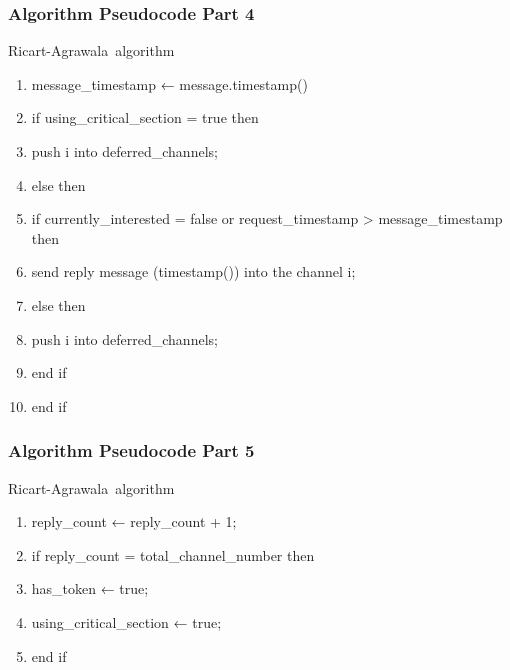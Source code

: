 \documentclass[11pt]{beamer}              %
\begin{document}
\begin{frame}
\frametitle{Algorithm Pseudocode Part 4}

\begin{center}
\begin{algorithm}[H]
	\scriptsize
	\def\algorithmlabel{Ricart-Agrawala}
    \caption{\algorithmlabel\ algorithm}
    \label{alg:ricart_agrawala}
    \begin{algorithmic}[1]
            \begin{enumerate}
                \item message\_timestamp ← message.timestamp()
                \item if using\_critical\_section = true then
                \item \quad push i into deferred\_channels;
                \item else then
                \item \quad if currently\_interested = false or request\_timestamp > message\_timestamp then
                \item \quad\quad send reply message (timestamp()) into the channel i;
                \item \quad else then
                \item \quad\quad push i into deferred\_channels;
                \item \quad end if
                \item end if
            \end{enumerate}
    \end{algorithmic}
\end{algorithm}
\end{center}
\end{frame}

\begin{frame}
\frametitle{Algorithm Pseudocode Part 5}

\begin{center}
\begin{algorithm}[H]
	\scriptsize
	\def\algorithmlabel{Ricart-Agrawala}
    \caption{\algorithmlabel\ algorithm}
    \label{alg:ricart_agrawala}
    \begin{algorithmic}[1]
            \begin{enumerate}
                \item reply\_count ← reply\_count + 1;
                \item if reply\_count = total\_channel\_number then
                \item \quad has\_token ← true;
                \item \quad using\_critical\_section ← true;
                \item end if
            \end{enumerate}

    \end{algorithmic}
\end{algorithm}
\end{center}
\end{frame}
\end{document}

